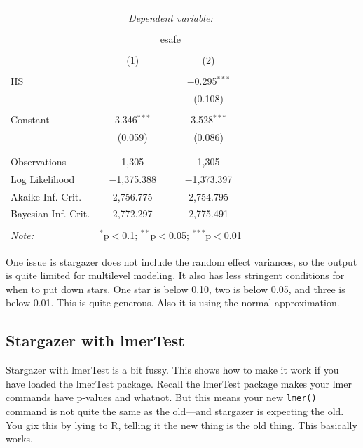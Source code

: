 \documentclass[
  letterpaper,
  DIV=11,
  numbers=noendperiod]{scrreprt}
\begin{document}
\begin{table}[!htbp] \centering 
  \caption{} 
  \label{} 
\begin{tabular}{@{\extracolsep{5pt}}lcc} 
\\[-1.8ex]\hline 
\hline \\[-1.8ex] 
 & \multicolumn{2}{c}{\textit{Dependent variable:}} \\ 
\cline{2-3} 
\\[-1.8ex] & \multicolumn{2}{c}{esafe} \\ 
\\[-1.8ex] & (1) & (2)\\ 
\hline \\[-1.8ex] 
 HS &  & $-$0.295$^{***}$ \\ 
  &  & (0.108) \\ 
  & & \\ 
 Constant & 3.346$^{***}$ & 3.528$^{***}$ \\ 
  & (0.059) & (0.086) \\ 
  & & \\ 
\hline \\[-1.8ex] 
Observations & 1,305 & 1,305 \\ 
Log Likelihood & $-$1,375.388 & $-$1,373.397 \\ 
Akaike Inf. Crit. & 2,756.775 & 2,754.795 \\ 
Bayesian Inf. Crit. & 2,772.297 & 2,775.491 \\ 
\hline 
\hline \\[-1.8ex] 
\textit{Note:}  & \multicolumn{2}{r}{$^{*}$p$<$0.1; $^{**}$p$<$0.05; $^{***}$p$<$0.01} \\ 
\end{tabular} 
\end{table}

One issue is stargazer does not include the random effect variances, so
the output is quite limited for multilevel modeling. It also has less
stringent conditions for when to put down stars. One star is below 0.10,
two is below 0.05, and three is below 0.01. This is quite generous. Also
it is using the normal approximation.

\subsection{Stargazer with lmerTest}\label{stargazer-with-lmertest}

Stargazer with lmerTest is a bit fussy. This shows how to make it work
if you have loaded the lmerTest package. Recall the lmerTest package
makes your lmer commands have p-values and whatnot. But this means your
new \texttt{lmer()} command is not quite the same as the old---and
stargazer is expecting the old. You gix this by lying to R, telling it
the new thing is the old thing. This basically works.
\end{document}
